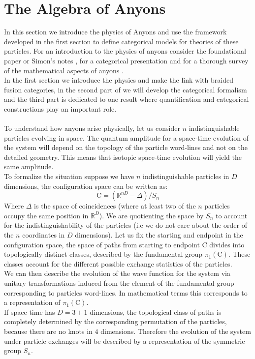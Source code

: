 \documentclass{article}
\begin{document}
\section{The Algebra of Anyons}\label{Thealgebraofanyons}
In this section we introduce the physics of Anyons and use the framework developed in the first section to define categorical models for theories of these particles. For an introduction to the physics of anyons consider the foundational paper \cite{Kitaev06} or Simon's notes \cite{Simon16}, for a categorical presentation \cite{Panangaden11} and for a thorough survey of the mathematical aspects of anyons \cite{Rowell17}.\\
In the first section we introduce the physics and make the link with braided fusion categories, in the second part of we will develop the categorical formalism and the third part is dedicated to one result where quantification and categorical constructions play an important role.\\~\\
To understand how anyons arise physically, let us consider $n$ indistinguishable particles evolving in space. The quantum amplitude for a space-time evolution of the system will depend on the topology of the particle word-lines and not on the detailed geometry. This means that isotopic space-time evolution will yield the same amplitude.\\
To formalize the situation suppose we have $n$ indistinguishable particles in $D$ dimensions, the configuration space can be written as:
$$ \mathrm{C}=(\mathbb{R}^{nD}-\Delta)/S_n$$
Where $\Delta$ is the space of coincidences (where at least two of the $n$ particles occupy the same position in $\mathbb{R}^D$). We are quotienting the space by $S_n$ to account for the indistinguishability of the particles (i.e we do not care about the order of the $n$ coordinates in $D$ dimensions). 
Let us fix the starting and endpoint in the configuration space, the space of paths from starting to endpoint $\mathrm{C}$ divides into topologically distinct classes, described by the fundamental group $\pi_1(\mathrm{C})$. These classes account for the different possible exchange statistics of the particles.\\
We can then describe the evolution of the wave function for the system via unitary transformations induced from the element of the fundamental group corresponding to particles word-lines. In mathematical terms this corresponds to a representation of $\pi_1(\mathrm{C})$. \\
If space-time has $D=3+1$ dimensions, the topological class of paths is completely determined by the corresponding permutation of the particles, because there are no knots in $4$ dimensions. Therefore the evolution of the system under particle exchanges will be described by a representation of the symmetric group $S_n$.
\end{document}
